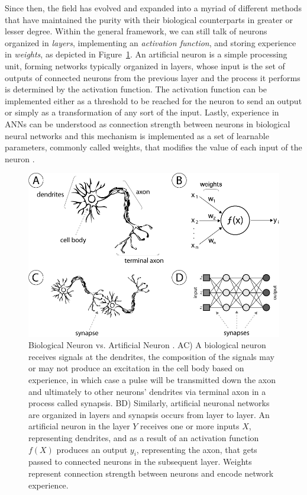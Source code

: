 Since then, the field has evolved and expanded into a myriad of different methods that have maintained the purity with their biological counterparts in greater or lesser degree.
Within the general framework, we can still talk of neurons organized in \emph{layers}, implementing an \emph{activation function}, and storing experience in \emph{weights}, as depicted in Figure~\ref{fig:sec:theory:neurons}.
An artificial neuron is a simple processing unit, forming networks typically organized in layers, whose input is the set of outputs of connected neurons from the previous layer and the process it performs is determined by the activation function.
The activation function can be implemented either as a threshold to be reached for the neuron to send an output or simply as a transformation of any sort of the input.
Lastly, experience in ANNs can be understood as connection strength between neurons in biological neural networks and this mechanism is implemented as a set of learnable parameters, commonly called weights, that modifies the value of each input of the neuron \cite{Hinton1990}.

\begin{figure}[htb]
  \includegraphics[width=\textwidth]{gfx/neurons}
  \caption{Biological Neuron vs. Artificial Neuron \cite{Honorio2013}.
    AC) A biological neuron receives signals at the dendrites, the composition of the signals may or may not produce an excitation in the cell body based on experience, in which case a pulse will be transmitted down the axon and ultimately to other neurons' dendrites via terminal axon in a process called synapsis.
    BD) Similarly, artificial neuronal networks are organized in layers and synapsis occurs from layer to layer.
    An artificial neuron in the layer $Y$ receives one or more inputs $X$, representing dendrites, and as a result of an activation function $f(X)$ produces an output $y_i$, representing the axon, that gets passed to connected neurons in the subsequent layer.
    Weights represent connection strength between neurons and encode network experience.}
  \label{fig:sec:theory:neurons}
\end{figure}


